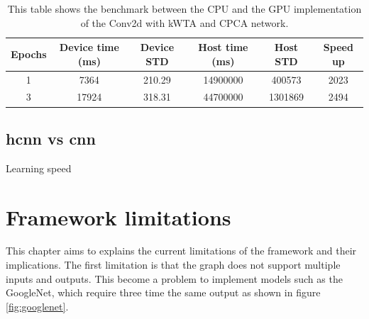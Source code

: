 \documentclass[11pt]{report}
\begin{document}
\begin{table}[h!]
\centering
\begin{tabular}{ c c c c c c }
Epochs & Device time (ms) & Device STD & Host time (ms) & Host STD & Speed up\\
\hline
1 & 7364  & 210.29 & 14900000 & 400573  & 2023 \\
3 & 17924 & 318.31 & 44700000 & 1301869 & 2494
\end{tabular}
\caption[Speed benchmark: Conv2d network with CPCA and kWTA]{This table shows the benchmark between the CPU and the GPU implementation of the Conv2d with kWTA and CPCA network.}
\end{table}
\newpage

\section{\acrshort{hcnn} vs \acrshort{cnn}}

Learning speed


\chapter{Framework limitations} \label{framework_limitation}

This chapter aims to explains the current limitations of the framework and their implications. The first limitation is that the graph does not support multiple inputs and outputs. This become a problem to implement models such as the GoogleNet, which require three time the same output as shown in figure \ref{fig:googlenet}.
\end{document}
